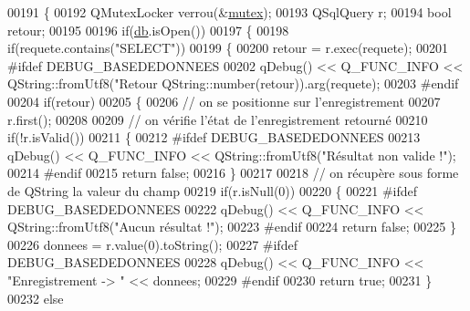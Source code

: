 \begin{DoxyCode}
00191 \{
00192     QMutexLocker verrou(&\hyperlink{class_base_de_donnees_aa1b4696fac87a740f914aa73739086f2}{mutex});
00193     QSqlQuery r;
00194     \textcolor{keywordtype}{bool} retour;
00195 
00196     \textcolor{keywordflow}{if}(\hyperlink{class_base_de_donnees_a3e738dcf443370c46a541677ab619f06}{db}.isOpen())
00197     \{
00198         \textcolor{keywordflow}{if}(requete.contains(\textcolor{stringliteral}{"SELECT"}))
00199         \{
00200             retour = r.exec(requete);
00201 \textcolor{preprocessor}{            #ifdef DEBUG\_BASEDEDONNEES}
00202             qDebug() << Q\_FUNC\_INFO << QString::fromUtf8(\textcolor{stringliteral}{"Retour %
      QString::number(retour)).arg(requete);
00203 \textcolor{preprocessor}{            #endif}
00204             \textcolor{keywordflow}{if}(retour)
00205             \{
00206                 \textcolor{comment}{// on se positionne sur l'enregistrement}
00207                 r.first();
00208 
00209                 \textcolor{comment}{// on vérifie l'état de l'enregistrement retourné}
00210                 \textcolor{keywordflow}{if}(!r.isValid())
00211                 \{
00212 \textcolor{preprocessor}{                    #ifdef DEBUG\_BASEDEDONNEES}
00213                     qDebug() << Q\_FUNC\_INFO << QString::fromUtf8(\textcolor{stringliteral}{"Résultat non valide !"});
00214 \textcolor{preprocessor}{                    #endif}
00215                     \textcolor{keywordflow}{return} \textcolor{keyword}{false};
00216                 \}
00217 
00218                 \textcolor{comment}{// on récupère sous forme de QString la valeur du champ}
00219                 \textcolor{keywordflow}{if}(r.isNull(0))
00220                 \{
00221 \textcolor{preprocessor}{                    #ifdef DEBUG\_BASEDEDONNEES}
00222                     qDebug() << Q\_FUNC\_INFO << QString::fromUtf8(\textcolor{stringliteral}{"Aucun résultat !"});
00223 \textcolor{preprocessor}{                    #endif}
00224                     \textcolor{keywordflow}{return} \textcolor{keyword}{false};
00225                 \}
00226                 donnees = r.value(0).toString();
00227 \textcolor{preprocessor}{                #ifdef DEBUG\_BASEDEDONNEES}
00228                 qDebug() << Q\_FUNC\_INFO << \textcolor{stringliteral}{"Enregistrement -> "} << donnees;
00229 \textcolor{preprocessor}{                #endif}
00230                 \textcolor{keywordflow}{return} \textcolor{keyword}{true};
00231             \}
00232             \textcolor{keywordflow}{else}
}
\end{DoxyCode}
